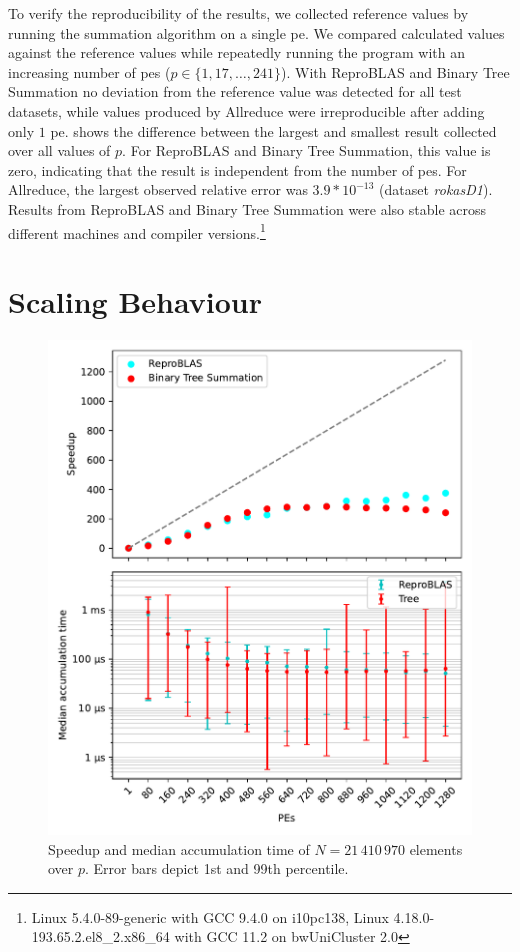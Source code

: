 To verify the reproducibility of the results, we collected reference values by running the summation algorithm on a single \gls{pe}.
We compared calculated values against the reference values while repeatedly running the program with an increasing number of \glspl{pe} ($p \in \{1, 17, \ldots, 241 \}$).
With ReproBLAS and Binary Tree Summation no deviation from the reference value was detected for all test datasets, while values produced by Allreduce were irreproducible after adding only $1$ \gls{pe}.
 shows the difference between the largest and smallest result collected over all values of $p$.
For ReproBLAS and Binary Tree Summation, this value is zero, indicating that the result is independent from the number of \glspl{pe}.
For Allreduce, the largest observed relative error was $3.9 * 10^{-13}$ (dataset \textit{rokasD1}).
Results from ReproBLAS and Binary Tree Summation were also stable across different machines and compiler versions.\footnote{Linux 5.4.0-89-generic with GCC 9.4.0 on i10pc138, Linux 4.18.0-193.65.2.el8\_2.x86\_64 with GCC 11.2 on bwUniCluster 2.0}

\section{Scaling Behaviour}
\label{sec:ScalingBehaviour}

\begin{figure}
\centering
\includegraphics[scale=0.8]{figures/scaling.pdf}
\caption{Speedup and median accumulation time of $N=21\,410\,970$ elements over $p$. Error bars depict 1st and 99th percentile.}
\label{fig:ClusterScaling}
\end{figure}

